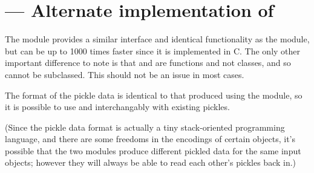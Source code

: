 \section{ ---
         Alternate implementation of }



The  module provides a similar interface and identical
functionality as the  module,
but can be up to 1000 times faster since it is implemented in C.  The
only other important difference to note is that 
and  are functions and not classes, and so
cannot be subclassed.  This should not be an issue in most cases.

The format of the pickle data is identical to that produced using the
 module, so it is possible to use  and
 interchangably with existing pickles.

(Since the pickle data format is actually a tiny stack-oriented
programming language, and there are some freedoms in the encodings of
certain objects, it's possible that the two modules produce different
pickled data for the same input objects; however they will always be
able to read each other's pickles back in.)
